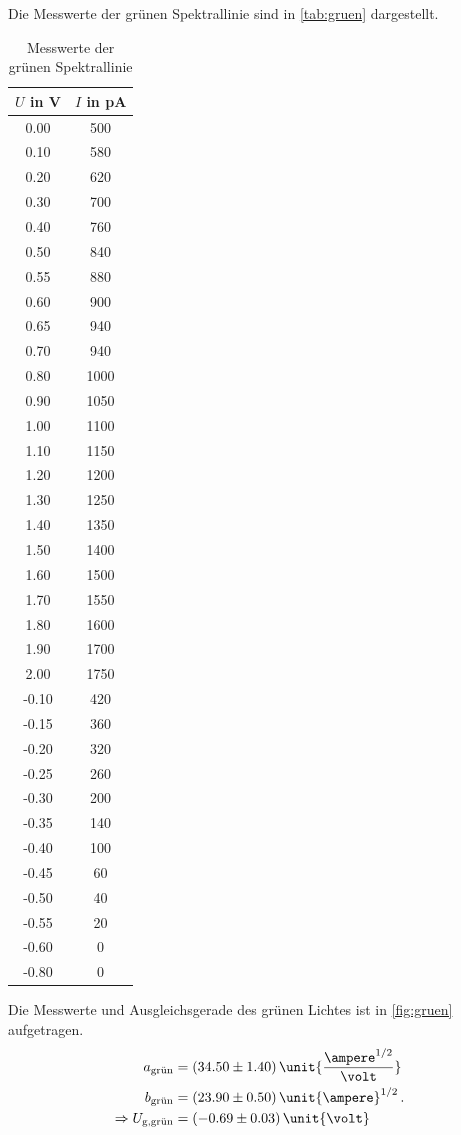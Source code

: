 Die Messwerte der grünen Spektrallinie sind in \autoref{tab:gruen} dargestellt.
\begin{table}
    \centering 
    \caption{Messwerte der grünen Spektrallinie}
\begin{tabular}{c c}
    \toprule
    $U$ in V&$I$ in pA \\
    \midrule
    0.00 & 500 \\
    0.10 & 580 \\
    0.20 & 620 \\
    0.30 & 700 \\
    0.40 & 760 \\
    0.50 & 840 \\
    0.55 & 880 \\
    0.60 & 900 \\
    0.65 & 940 \\
    0.70 & 940 \\
   0.80 & 1000 \\
   0.90 & 1050 \\
   1.00 & 1100 \\
   1.10 & 1150 \\
   1.20 & 1200 \\
   1.30 & 1250 \\
   1.40 & 1350 \\
   1.50 & 1400 \\
   1.60 & 1500 \\
   1.70 & 1550 \\
   1.80 & 1600 \\
   1.90 & 1700 \\
   2.00 & 1750 \\
    -0.10 & 420 \\
   -0.15 & 360 \\
    -0.20 & 320 \\
   -0.25 & 260 \\
    -0.30 & 200 \\
   -0.35 & 140 \\
    -0.40 & 100 \\
    -0.45 & 60 \\
     -0.50 & 40 \\
    -0.55 & 20 \\
      -0.60 & 0 \\
      -0.80 & 0 \\
    \bottomrule
    \end{tabular}
    \label{tab:gruen}
\end{table}

Die Messwerte und Ausgleichsgerade des grünen Lichtes ist in \autoref{fig:gruen} aufgetragen.
\begin{align*}
    a_{\text{grün}}&=(34.50\pm 1.40) \, \unit{\frac{\ampere ^{1/2}}{\volt}}\\
    b_{\text{grün}}&=(23.90\pm 0.50) \, \unit{\ampere}^{1/2}\, .\\
    \Rightarrow U_{\text{g,grün}}&=(-0.69\pm 0.03)\, \unit{\volt}\\
\end{align*}

